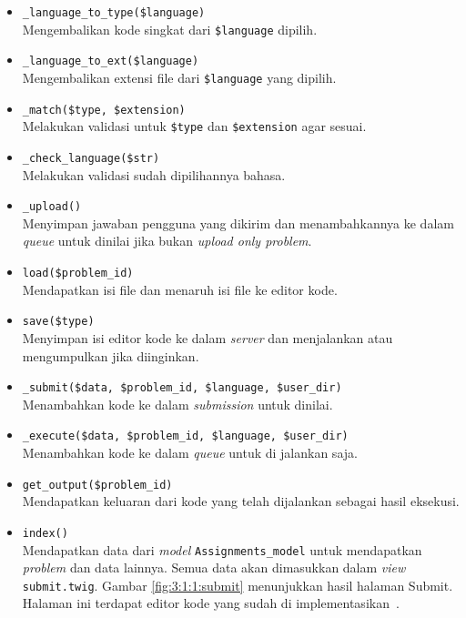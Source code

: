 \documentclass[a4paper,twoside]{article}
\begin{document}
\begin{enumerate}
\begin{itemize}
\begin{itemize}
			                  \begin{itemize}
				                  \item \verb|_language_to_type($language)| \\
				                        Mengembalikan kode singkat dari \verb|$language| dipilih.
				                  \item \verb|_language_to_ext($language)| \\
				                        Mengembalikan extensi file dari \verb|$language| yang dipilih.
				                  \item \verb|_match($type, $extension)| \\
				                        Melakukan validasi untuk \verb|$type| dan \verb|$extension| agar sesuai.
				                  \item \verb|_check_language($str)| \\
				                        Melakukan validasi sudah dipilihannya bahasa.
				                  \item \verb|_upload()| \\
				                        Menyimpan jawaban pengguna yang dikirim dan menambahkannya ke dalam \textit{queue} untuk dinilai jika bukan \textit{upload only problem}.
				                  \item \verb|load($problem_id)| \\
				                        Mendapatkan isi file dan menaruh isi file ke editor kode.
				                  \item \verb|save($type)| \\
				                        Menyimpan isi editor kode ke dalam \textit{server} dan menjalankan atau mengumpulkan jika diinginkan.
				                  \item \verb|_submit($data, $problem_id, $language, $user_dir)| \\
				                        Menambahkan kode ke dalam \textit{submission} untuk dinilai.
				                  \item \verb|_execute($data, $problem_id, $language, $user_dir)| \\
				                        Menambahkan kode ke dalam \textit{queue} untuk di jalankan saja.
				                  \item \verb|get_output($problem_id)| \\
				                        Mendapatkan keluaran dari kode yang telah dijalankan sebagai hasil eksekusi.
				                  \item \verb|index()| \\
				                        Mendapatkan data dari \textit{model} \verb|Assignments_model| untuk mendapatkan \textit{problem} dan data lainnya. Semua data akan dimasukkan dalam \textit{view} \verb|submit.twig|. Gambar \ref{fig:3:1:1:submit} menunjukkan hasil halaman Submit. Halaman ini terdapat editor kode yang sudah di implementasikan~\cite{nicholas:sharif}.


\end{itemize}
\end{itemize}
\end{itemize}
\end{enumerate}
\end{document}
